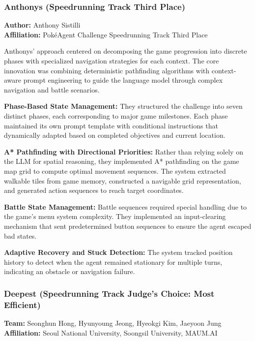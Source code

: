 \subsubsection{Anthonys (Speedrunning Track Third Place)}
\label{sec:anthonys}

\textbf{Author:} Anthony Sistilli \\
\textbf{Affiliation:} Pok\'eAgent Challenge Speedrunning Track Third Place

Anthonys' approach centered on decomposing the game progression into discrete phases with specialized navigation strategies for each context. The core innovation was combining deterministic pathfinding algorithms with context-aware prompt engineering to guide the language model through complex navigation and battle scenarios.

\textbf{Phase-Based State Management:} They structured the challenge into seven distinct phases, each corresponding to major game milestones. Each phase maintained its own prompt template with conditional instructions that dynamically adapted based on completed objectives and current location.

\textbf{A* Pathfinding with Directional Priorities:} Rather than relying solely on the LLM for spatial reasoning, they implemented A* pathfinding on the game map grid to compute optimal movement sequences. The system extracted walkable tiles from game memory, constructed a navigable grid representation, and generated action sequences to reach target coordinates.

\textbf{Battle State Management:} Battle sequences required special handling due to the game's menu system complexity. They implemented an input-clearing mechanism that sent predetermined button sequences to ensure the agent escaped bad states.

\textbf{Adaptive Recovery and Stuck Detection:} The system tracked position history to detect when the agent remained stationary for multiple turns, indicating an obstacle or navigation failure.

\subsubsection{Deepest (Speedrunning Track Judge's Choice: Most Efficient)}
\label{sec:deepest}

\textbf{Team:} Seonghun Hong, Hyunyoung Jeong, Hyeokgi Kim, Jaeyoon Jung \\
\textbf{Affiliation:} Seoul National University, Soongsil University, MAUM.AI

